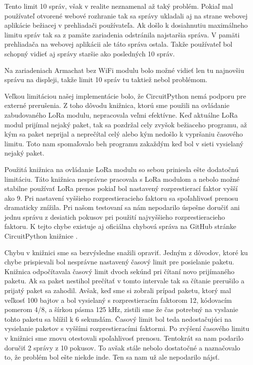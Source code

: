 \documentclass[slovak,master]{diploma}
\begin{document}
Tento limit 10 správ, však v realite neznamenal až taký problém. Pokiaľ mal používateľ otvorené webové rozhranie tak sa správy ukladali aj na strane webovej aplikácie 
bežiacej v prehliadači používateľa. Ak došlo k dosiahnutiu maximálneho limitu správ tak sa z pamäte zariadenia odstránila najstaršia správa. V pamäti prehliadača na webovej aplikácii 
ale táto správa ostala. Takže používateľ bol schopný vidieť aj správy staršie ako posledných 10 správ.

Na zariadeniach Armachat bez WiFi modulu bolo možné vidieť len tu najnovšiu správu na displeji, takže limit 10 správ tu taktiež nebol problémom.

Veľkou limitáciou našej implementácie bolo, že CircuitPython nemá podporu pre externé prerušenia. Z toho dôvodu knižnica, ktorú sme použili na ovládanie zabudovaného LoRa modulu, 
nepracovala veľmi efektívne. Keď aktuálne LoRa modul prijímal nejaký paket, tak sa pozdržal cely zvyšok bežiaceho programu, až kým sa paket neprijal a neprečítal celý alebo kým nedošlo k vypršaniu 
časového limitu. Toto nam spomaľovalo beh programu zakaždým keď bol v sieti vysielaný nejaký paket.

Použitá knižnica na ovládanie LoRa modulu so sebou priniesla ešte dodatočnú limitáciu. Táto knižnica nesprávne pracovala s LoRa modulom a nebolo možné stabilne používať 
LoRa prenos pokiaľ bol nastavený rozprestierací faktor vyšší ako 9. Pri nastavení vyššieho rozprestieracieho faktoru sa spoľahlivosť prenosu dramaticky znížila. Pri 
našom testovaní sa nám nepodarilo úspešne doručiť ani jednu správu z desiatich pokusov pri použití najvyššieho rozprestieracieho faktoru. 
K tejto chybe existuje aj oficiálna chybová správa na GitHub stránke CircuitPython knižnice \cite{rfmIssue}.

Chybu v knižnici sme sa bezvýsledne snažili opraviť. Jedným z dôvodov, ktoré ku chybe prispievali bol nesprávne nastavený časový limit pre posielanie paketu. Knižnica odpočítavala časový limit dvoch sekúnd 
pri čítaní novo prijímaného paketu. Ak sa paket nestihol prečítať v tomto intervale tak sa čítanie prerušilo a prijatý paket sa zahodil. 
Avšak, keď sme si zobrali prípad paketu, ktorý mal veľkosť 100 bajtov a bol vysielaný s rozprestieracím faktorom 12, kódovacím pomerom 4/8, a šírkou pásma 125 kHz, zistili sme 
že čas potrebný na vyslanie tohto paketu sa blížil k 6 sekundám. Časový limit bol teda nedostačujúci na vysielanie paketov s vyššími rozprestieracími faktormi. Po 
zvýšení časového limitu v knižnici sme znovu otestovali spoľahlivosť prenosu. Tentokrát sa nam podarilo doručiť 2 správy z 10 pokusov. To avšak stále nebolo dostatočné a 
naznačovalo to, že problém bol ešte niekde inde. Ten sa nam už ale nepodarilo nájsť.
\end{document}
